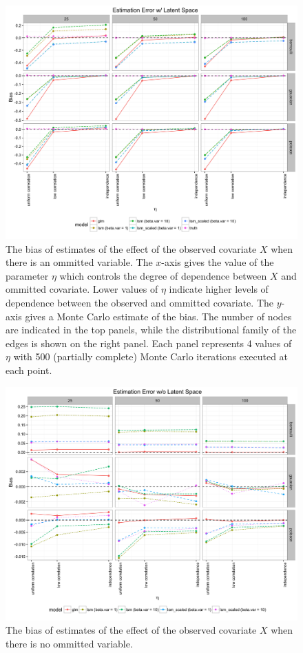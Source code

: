 \documentclass[12pt]{article}
\begin{document}
\begin{figure}
\includegraphics[width=\textwidth]{estimation_ls.png}
\caption{The bias of estimates of the effect of the observed covariate $X$ when there is an ommitted variable. The $x$-axis gives the value of the parameter $\eta$ which controls the degree of dependence between $X$ and ommitted covariate. Lower values of $\eta$ indicate higher levels of dependence between the observed and ommitted covariate. The $y$-axis gives a Monte Carlo estimate of the bias. The number of nodes are indicated in the top panels, while the distributional family of the edges is shown on the right panel. Each panel represents 4 values of $\eta$ with 500 (partially complete) Monte Carlo iterations executed at each point.
\label{fig:estimation_ls}}
\end{figure}

\begin{figure}
\includegraphics[width=\textwidth]{estimation_nls.png}
\caption{The bias of estimates of the effect of the observed covariate $X$ when there is no ommitted variable.
\label{fig:estimation_nls}}
\end{figure}
\end{document}
